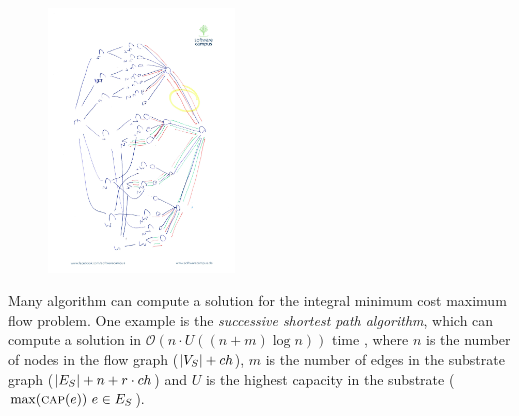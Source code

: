 \begin{figure}
\includegraphics[angle=90,origin=c, height=7cm]{figs/model_fig_skteches/flow}
\end{figure}


Many algorithm can compute a solution for the integral minimum cost maximum 
flow problem. One example is the \textit{successive shortest path algorithm}, 
which can compute a solution in $\mathcal{O}(n \cdot U((n+m)\log n)
)$ time \cite{successive_shortest_path_complexity}, where $n$ is the number of 
nodes in the flow graph ($|V_S| + ch$), $m$ is the number 
of edges in the substrate graph ($|E_S| + n + r 
\cdot ch$) and $U$ is the highest capacity in the substrate 
($\max(\textsc{cap}(e))~e\in E_S$).




